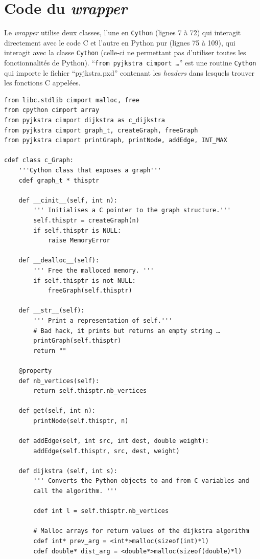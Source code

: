 \documentclass{article}
\begin{document}
\appendix
\section{Code du \emph{wrapper}}\label{sec:code-du-wrapper}
Le \emph{wrapper} utilise deux classes, l'une en \texttt{Cython} (lignes 7 à 72) qui
interagit directement avec le code C et l'autre en Python pur (lignes
75 à 109), qui interagit avec la classe \texttt{Cython} (celle-ci ne permettant
pas d'utiliser toutes les fonctionnalités de Python). ``\texttt{from pyjkstra cimport …}''
est une routine \texttt{Cython} qui importe le fichier ``pyjkstra.pxd''
contenant les \emph{headers} dans lesquels trouver les fonctions C appelées.
\begin{verbatim}
from libc.stdlib cimport malloc, free
from cpython cimport array
from pyjkstra cimport dijkstra as c_dijkstra
from pyjkstra cimport graph_t, createGraph, freeGraph
from pyjkstra cimport printGraph, printNode, addEdge, INT_MAX

cdef class c_Graph:
    '''Cython class that exposes a graph'''
    cdef graph_t * thisptr

    def __cinit__(self, int n):
        ''' Initialises a C pointer to the graph structure.'''
        self.thisptr = createGraph(n)
        if self.thisptr is NULL:
            raise MemoryError

    def __dealloc__(self):
        ''' Free the malloced memory. '''
        if self.thisptr is not NULL:
            freeGraph(self.thisptr)

    def __str__(self):
        ''' Print a representation of self.'''
        # Bad hack, it prints but returns an empty string …
        printGraph(self.thisptr)
        return ""

    @property
    def nb_vertices(self):
        return self.thisptr.nb_vertices

    def get(self, int n):
        printNode(self.thisptr, n)

    def addEdge(self, int src, int dest, double weight):
        addEdge(self.thisptr, src, dest, weight)

    def dijkstra (self, int s):
        ''' Converts the Python objects to and from C variables and
        call the algorithm. '''

        cdef int l = self.thisptr.nb_vertices

        # Malloc arrays for return values of the dijkstra algorithm
        cdef int* prev_arg = <int*>malloc(sizeof(int)*l)
        cdef double* dist_arg = <double*>malloc(sizeof(double)*l)


\end{verbatim}
\end{document}
